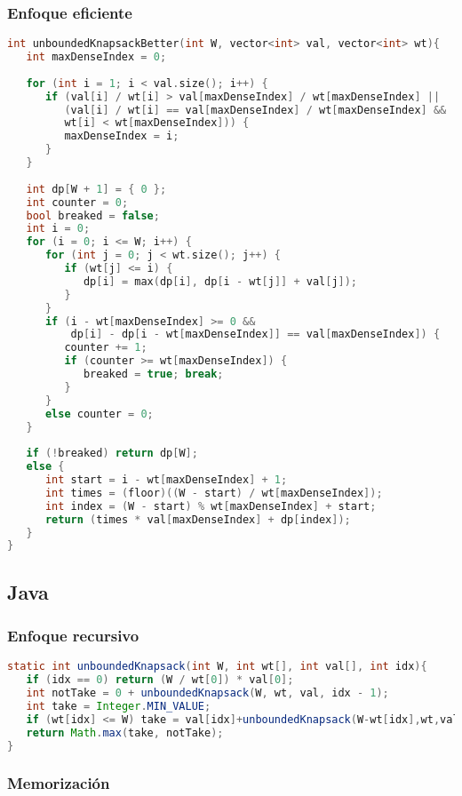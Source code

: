 \subsubsection{Enfoque eficiente}
\begin{lstlisting}[language=C++]
int unboundedKnapsackBetter(int W, vector<int> val, vector<int> wt){
   int maxDenseIndex = 0;
	
   for (int i = 1; i < val.size(); i++) {
      if (val[i] / wt[i] > val[maxDenseIndex] / wt[maxDenseIndex] || 
         (val[i] / wt[i] == val[maxDenseIndex] / wt[maxDenseIndex] && 
         wt[i] < wt[maxDenseIndex])) {
         maxDenseIndex = i;
      }
   }
	
   int dp[W + 1] = { 0 };
   int counter = 0;
   bool breaked = false;
   int i = 0;
   for (i = 0; i <= W; i++) {
      for (int j = 0; j < wt.size(); j++) {
         if (wt[j] <= i) {
            dp[i] = max(dp[i], dp[i - wt[j]] + val[j]);
         }
      }
      if (i - wt[maxDenseIndex] >= 0 && 
          dp[i] - dp[i - wt[maxDenseIndex]] == val[maxDenseIndex]) {
         counter += 1;
         if (counter >= wt[maxDenseIndex]) {
            breaked = true; break;
         }
      } 
      else counter = 0; 
   }
	
   if (!breaked) return dp[W];
   else {
      int start = i - wt[maxDenseIndex] + 1;
      int times = (floor)((W - start) / wt[maxDenseIndex]);
      int index = (W - start) % wt[maxDenseIndex] + start;
      return (times * val[maxDenseIndex] + dp[index]);
   }
}
\end{lstlisting}

\subsection{Java}

\subsubsection{Enfoque recursivo}
\begin{lstlisting}[language=Java]
static int unboundedKnapsack(int W, int wt[], int val[], int idx){
   if (idx == 0) return (W / wt[0]) * val[0];
   int notTake = 0 + unboundedKnapsack(W, wt, val, idx - 1);
   int take = Integer.MIN_VALUE;
   if (wt[idx] <= W) take = val[idx]+unboundedKnapsack(W-wt[idx],wt,val,idx);
   return Math.max(take, notTake);
}
\end{lstlisting}

\subsubsection{Memorización}

